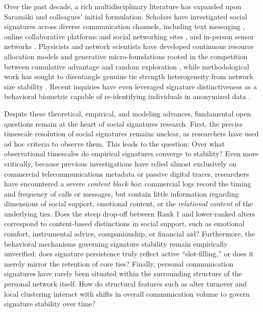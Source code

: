 \documentclass[11pt,letterpaper]{article}
\begin{document}
Over the past decade, a rich multidisciplinary literature has expanded upon Saram{\"a}ki and colleagues' initial formulation. Scholars have investigated social signatures across diverse communication channels, including text messaging \citep{heydari2018multichannel}, online collaborative platforms and social networking sites \citep{li2018social,koltsova2021social}, and in-person sensor networks \citep{li2022evidence,adel2026preferentiality}. Physicists and network scientists have developed continuous resource allocation models \citep{tamarit2022beyond} and generative micro-foundations rooted in the competition between cumulative advantage and random exploration \citep{iniguez2023universal}, while methodological work has sought to disentangle genuine tie strength heterogeneity from network size stability \citep{heydari2024disentangling,heydari2024dynamic}. Recent inquiries have even leveraged signature distinctiveness as a behavioral biometric capable of re-identifying individuals in anonymized data \citep{jia2025multidimensional}.

Despite these theoretical, empirical, and modeling advances, fundamental open questions remain at the heart of social signatures research. First, the precise timescale resolution of social signatures remains unclear, as researchers have used ad hoc criteria to observe them. This leads to the question: Over what observational timescales do empirical signatures converge to stability? Even more critically, because previous investigations have relied almost exclusively on commercial telecommunications metadata or passive digital traces, researchers have encountered a severe \textit{content black box}: commercial logs record the timing and frequency of calls or messages, but contain little information regarding dimensions of social support, emotional content, or the \textit{relational content} \citep{burt1985relation} of the underlying ties. Does the steep drop-off between Rank 1 and lower-ranked alters correspond to content-based distinctions in social support, such as emotional comfort, instrumental advice, companionship, or financial aid? Furthermore, the behavioral mechanisms governing signature stability remain empirically unverified: does signature persistence truly reflect active ``slot-filling,'' or does it merely mirror the retention of core ties? Finally, personal communication signatures have rarely been situated within the surrounding structure of the personal network itself. How do structural features such as alter turnover and local clustering interact with shifts in overall communication volume to govern signature stability over time? 
\end{document}
